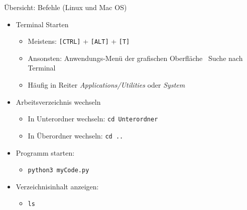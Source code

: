 
\begin{frame}{Übersicht: Befehle (Linux und Mac OS)}
\begin{itemize}
\item Terminal Starten
	\begin{itemize}
	\item Meistens: \texttt{[CTRL]} + \texttt{[ALT]} + \texttt{[T]}
	\item Ansonsten: Anwendungs-Menü der grafischen Oberfläche \thus ~Suche nach Terminal
	\item Häufig in Reiter \emph{Applications/Utilities} oder \emph{System}
	\end{itemize}
\item Arbeitsverzeichnis wechseln
	\begin{itemize}
	\item In Unterordner wechseln: \texttt{cd Unterordner}
	\item In Überordner wechseln: \texttt{cd ..}
	\end{itemize}
\item Programm starten:
	\begin{itemize}
	\item \texttt{python3 myCode.py}
	\end{itemize}
\item Verzeichnisinhalt anzeigen:
	\begin{itemize}
	\item \texttt{ls}
	\end{itemize}
\end{itemize}
\end{frame}


